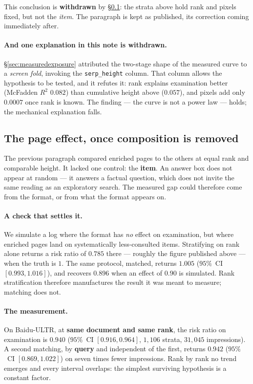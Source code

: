 \documentclass[11pt,a4paper]{article}
\begin{document}
This conclusion is \textbf{withdrawn} by \S\ref{sec:pageeffect}: the strata above hold rank and
pixels fixed, but not the \emph{item}. The paragraph is kept as published, its correction coming
immediately after.

\paragraph{And one explanation in this note is withdrawn.} \S\ref{sec:measuredexposure} attributed
the two-stage shape of the measured curve to a \emph{screen fold}, invoking the
\texttt{serp\_height} column. That column allows the hypothesis to be tested, and it refutes it:
rank explains examination better (McFadden $R^2$ $0.082$) than cumulative height above ($0.057$),
and pixels add only $0.0007$ once rank is known. The finding --- the curve is not a power law ---
holds; the mechanical explanation falls.

\subsection{The page effect, once composition is removed}
\label{sec:pageeffect}

The previous paragraph compared enriched pages to the others at equal rank and comparable height.
It lacked one control: the \textbf{item}. An answer box does not appear at random --- it answers a
factual question, which does not invite the same reading as an exploratory search. The measured
gap could therefore come from the format, or from what the format appears on.

\paragraph{A check that settles it.} We simulate a log where the format has \emph{no} effect on
examination, but where enriched pages land on systematically less-consulted items. Stratifying on
rank alone returns a risk ratio of $0.785$ there --- roughly the figure published above --- when
the truth is $1$. The same protocol, matched, returns $1.005$ ($95\%$~CI $[0.993, 1.016]$), and
recovers $0.896$ when an effect of $0.90$ is simulated. Rank stratification therefore manufactures
the result it was meant to measure; matching does not.

\paragraph{The measurement.} On Baidu-ULTR, at \textbf{same document and same rank}, the risk
ratio on examination is $0.940$ ($95\%$~CI $[0.916, 0.964]$, $1{,}106$ strata, $31{,}045$
impressions). A second matching, by \textbf{query} and independent of the first, returns $0.942$
($95\%$~CI $[0.869, 1.022]$) on seven times fewer impressions. Rank by rank no trend emerges and
every interval overlaps: the simplest surviving hypothesis is a constant factor.
\end{document}
